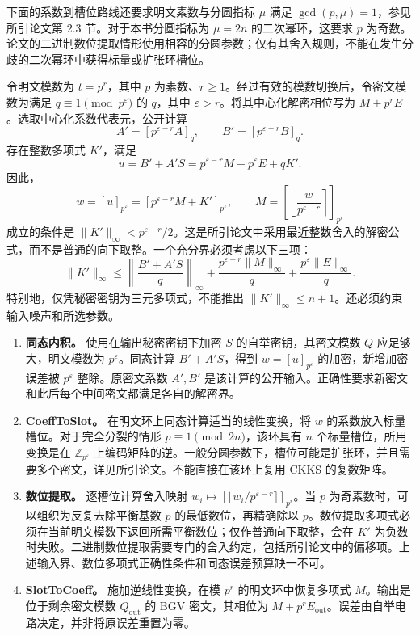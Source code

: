 下面的系数到槽位路线还要求明文素数与分圆指标 $\mu$ 满足 $\gcd(p,\mu)=1$，参见所引论文第 2.3 节。对于本书分圆指标为 $\mu=2n$ 的二次幂环，这要求 $p$ 为奇数。论文的二进制数位提取情形使用相容的分圆参数；仅有其舍入规则，不能在发生分歧的二次幂环中获得标量或扩张环槽位。

令明文模数为 $t=p^r$，其中 $p$ 为素数、$r\geq1$。经过有效的模数切换后，令密文模数为满足 $q\equiv1\pmod{p^\varepsilon}$ 的 $q$，其中 $\varepsilon>r$。将其中心化解密相位写为 $M+p^rE$。选取中心化系数代表元，公开计算
\[
A'=[p^{\varepsilon-r}A]_q,\qquad B'=[p^{\varepsilon-r}B]_q.
\]
存在整数多项式 $K'$，满足
\[
u=B'+A'S=p^{\varepsilon-r}M+p^\varepsilon E+qK'.
\]
因此，
\[
w=[u]_{p^\varepsilon}=[p^{\varepsilon-r}M+K']_{p^\varepsilon},\qquad
M=\left[\left\lfloor\frac{w}{p^{\varepsilon-r}}\right\rceil\right]_{p^r}
\]
成立的条件是 $\|K'\|_\infty<p^{\varepsilon-r}/2$。这是所引论文中采用最近整数舍入的解密公式，而不是普通的向下取整。一个充分界必须考虑以下三项：
\[
\|K'\|_\infty\leq\left\|\frac{B'+A'S}{q}\right\|_\infty+
\frac{p^{\varepsilon-r}\|M\|_\infty}{q}+
\frac{p^\varepsilon\|E\|_\infty}{q}.
\]
特别地，仅凭秘密密钥为三元多项式，不能推出 $\|K'\|_\infty\leq n+1$。还必须约束输入噪声和所选参数。

\begin{enumerate}
\item \textbf{同态内积。} 使用在输出秘密密钥下加密 $S$ 的自举密钥，其密文模数 $Q$ 应足够大，明文模数为 $p^\varepsilon$。同态计算 $B'+A'S$，得到 $w=[u]_{p^\varepsilon}$ 的加密，新增加密误差被 $p^\varepsilon$ 整除。原密文系数 $A',B'$ 是该计算的公开输入。正确性要求新密文和此后每个中间密文都满足各自的解密界。
\item \textbf{\textsf{CoeffToSlot}。} 在明文环上同态计算适当的线性变换，将 $w$ 的系数放入标量槽位。对于完全分裂的情形 $p\equiv1\pmod{2n}$，该环具有 $n$ 个标量槽位，所用变换是在 $\mathbb Z_{p^\varepsilon}$ 上编码矩阵的逆。一般分圆参数下，槽位可能是扩张环，并且需要多个密文，详见所引论文。不能直接在该环上复用 CKKS 的复数矩阵。
\item \textbf{数位提取。} 逐槽位计算舍入映射 $w_i\mapsto[\lfloor w_i/p^{\varepsilon-r}\rceil]_{p^r}$。当 $p$ 为奇素数时，可以组织为反复去除平衡基数 $p$ 的最低数位，再精确除以 $p$。数位提取多项式必须在当前明文模数下返回所需平衡数位；仅作普通向下取整，会在 $K'$ 为负数时失败。二进制数位提取需要专门的舍入约定，包括所引论文中的偏移项。上述输入界、数位多项式正确性条件和同态误差预算缺一不可。
\item \textbf{\textsf{SlotToCoeff}。} 施加逆线性变换，在模 $p^r$ 的明文环中恢复多项式 $M$。输出是位于剩余密文模数 $Q_{\mathrm{out}}$ 的 BGV 密文，其相位为 $M+p^rE_{\mathrm{out}}$。误差由自举电路决定，并非将原误差重置为零。
\end{enumerate}

